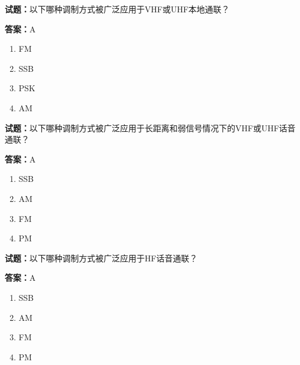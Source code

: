 \documentclass{ctexbook}
\begin{document}
\textbf{试题：}以下哪种调制方式被广泛应用于VHF或UHF本地通联？ 

\textbf{答案：}A 

\begin{enumerate}[leftmargin=3em]
  \item FM 

  \item SSB 

  \item PSK 

  \item AM 

\end{enumerate}





\vspace{1em}

\textbf{试题：}以下哪种调制方式被广泛应用于长距离和弱信号情况下的VHF或UHF话音通联？ 

\textbf{答案：}A 


\begin{enumerate}[leftmargin=3em]
  \item SSB 

  \item AM 

  \item FM 

  \item PM 

\end{enumerate}





\vspace{1em}

\textbf{试题：}以下哪种调制方式被广泛应用于HF话音通联？ 

\textbf{答案：}A 

\begin{enumerate}[leftmargin=3em]
  \item SSB 

  \item AM 

  \item FM 

  \item PM 

\end{enumerate}
\end{document}
